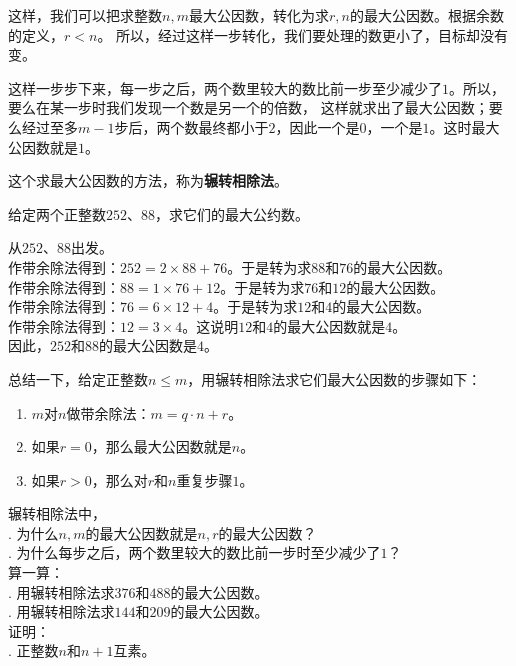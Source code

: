 \documentclass[12pt,UTF8]{ctexbook}
\begin{document}
这样，我们可以把求整数$n,m$最大公因数，转化为求$r,n$的最大公因数。根据余数的定义，$r < n$。
所以，经过这样一步转化，我们要处理的数更小了，目标却没有变。

这样一步步下来，每一步之后，两个数里较大的数比前一步至少减少了$1$。所以，要么在某一步时我们发现一个数是另一个的倍数，
这样就求出了最大公因数；要么经过至多$m-1$步后，两个数最终都小于$2$，因此一个是$0$，一个是$1$。这时最大公因数就是$1$。

这个求最大公因数的方法，称为\textbf{辗转相除法}。

\begin{et}
    给定两个正整数$252$、$88$，求它们的最大公约数。
\end{et}

\begin{so}
    从$252$、$88$出发。\\
    作带余除法得到：$252 = 2 \times 88 + 76$。于是转为求$88$和$76$的最大公因数。\\
    作带余除法得到：$88 = 1 \times 76 + 12$。于是转为求$76$和$12$的最大公因数。\\
    作带余除法得到：$76 = 6 \times 12 + 4$。于是转为求$12$和$4$的最大公因数。\\
    作带余除法得到：$12 = 3 \times 4$。这说明$12$和$4$的最大公因数就是$4$。\\
    因此，$252$和$88$的最大公因数是$4$。
\end{so}

总结一下，给定正整数$n\leqslant m$，用辗转相除法求它们最大公因数的步骤如下：
\begin{enumerate}
    \item $m$对$n$做带余除法：$m = q \cdot n + r$。
    \item 如果$r = 0$，那么最大公因数就是$n$。
    \item 如果$r > 0$，那么对$r$和$n$重复步骤$1$。
\end{enumerate}

\begin{xt}\label{xt:5-1-0}
    辗转相除法中，\\
    . 为什么$n,m$的最大公因数就是$n,r$的最大公因数？\\
    . 为什么每步之后，两个数里较大的数比前一步时至少减少了$1$？\\
    算一算：\\
    . 用辗转相除法求$376$和$488$的最大公因数。\\
    . 用辗转相除法求$144$和$209$的最大公因数。\\
    证明：\\
    . 正整数$n$和$n+1$互素。
\end{xt}
\end{document}
